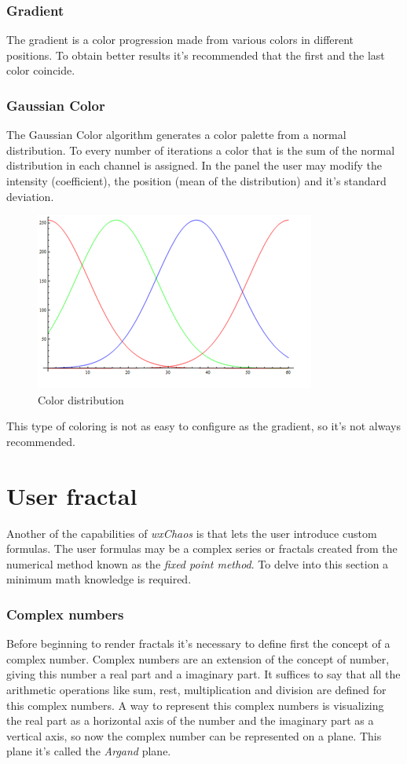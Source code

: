\documentclass[oneside]{book}
\begin{document}
\subsection{Gradient}
The gradient is a color progression made from various colors in different positions. To obtain better results it's recommended that the first and the last color coincide.

\subsection{Gaussian Color}
The Gaussian Color algorithm generates a color palette from a normal distribution. To every number of iterations a color that is the sum of the normal distribution in each channel is assigned. In the panel the user may modify the intensity (coefficient), the position (mean of the distribution) and it's standard deviation.

\begin{figure}[h!]
	\centering
	\includegraphics[scale=0.8]{img/dist.png}
	\caption{Color distribution}
	\label{Color dist}
\end{figure}

This type of coloring is not as easy to configure as the gradient, so it's not always recommended.

\chapter{User fractal}

Another of the capabilities of \textit{wxChaos} is that lets the user introduce custom formulas. The user formulas may be a complex series or fractals created from the numerical method known as the \textit{fixed point method}. To delve into this section a minimum math knowledge is required.

\subsection{Complex numbers}
Before beginning to render fractals it's necessary to define first the concept of a complex number. Complex numbers are an extension of the concept of number, giving this number a real part and a imaginary part. It suffices to say that all the arithmetic operations like sum, rest, multiplication and division are defined for this complex numbers. A way to represent this complex numbers is visualizing the real part as a horizontal axis of the number and the imaginary part as a vertical axis, so now the complex number can be represented on a plane. This plane it's called the \textit{Argand} plane.
\end{document}
